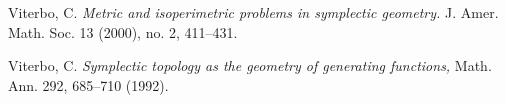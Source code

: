 \documentclass{icmart}
\theoremstyle{definition}
\begin{document}
\begin{thebibliography}{7}

 Viterbo, C. {\it Metric and isoperimetric problems in symplectic geometry.} J. Amer. Math. Soc. 13 (2000), no. 2, 411--431.

 Viterbo, C. {\it Symplectic topology as the geometry of
generating functions,} Math. Ann. 292, 685--710 (1992).



%
%
%

\end{thebibliography}
\end{document}
